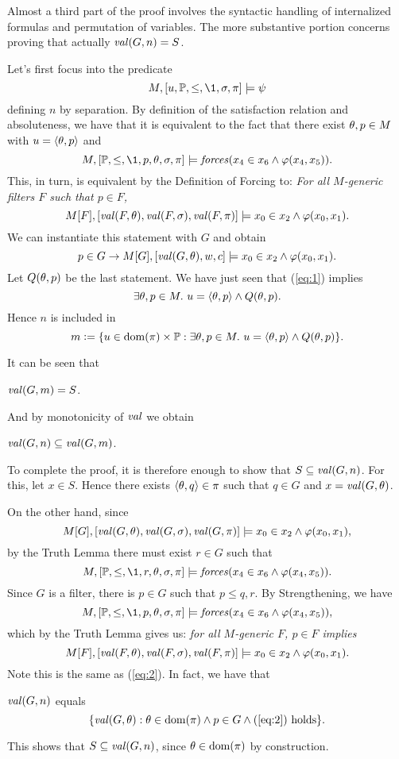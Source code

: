 Almost a third part of the proof involves the syntactic handling of
internalized formulas and permutation of variables. The more
substantive portion concerns proving that actually $\operatorname{\mathit{val}}(G,n)=S$.

Let's first focus into the predicate 
\begin{equation}\label{eq:1}
M,[u,\PP,\leq,\1,\sig,\pi]\models \psi
\end{equation}
defining $n$ by separation. By definition of the satisfaction
relation and %
absoluteness, we have that it is equivalent to the fact
that there exist $\theta,p\in M$ with   $u=\langle\theta,p\rangle$  and 
\[
M,[\PP,\leq,\1,p,\th,\sig,\pi]\models \forceisa(x_4\in
x_6\y\phi(x_4,x_5)). 
\]
This, in turn, is equivalent by the Definition of Forcing to: \emph{For all $M$-generic
filters $F$ such that $p\in F$,} 
\begin{equation}\label{eq:2}
M[F],[\val(F,\th),\val(F,\sig),\val(F,\pi)]\models x_0\in
x_2\y\phi(x_0,x_1). 
\end{equation}
We can instantiate this statement with $G$ and obtain
\[
p\in G \rightarrow M[G],[\operatorname{\mathit{val}}(G,\theta),w,c]\models x_0\in
x_2\wedge\varphi(x_0,x_1). 
\] 
Let $Q(\theta,p)$ be the last statement. We have just seen that
(\ref{eq:1}) implies 
\[
\exists \theta,p\in M.\ u=\langle\theta,p\rangle \wedge Q(\theta,p).
\]
Hence $n$ is included in 
\[
m\mathrel{\mathop:}= \{u \in\operatorname{dom}(\pi)\times\mathbb{P} : \exists \theta,p\in M.\ u=\langle\theta,p\rangle
\wedge Q(\theta,p)\}. 
\]

It can be seen that
\begin{lemma}
  $\operatorname{\mathit{val}}(G,m) = S$.
\end{lemma}
\noindent And by monotonicity of $\operatorname{\mathit{val}}$ we obtain
\begin{lemma}
  $\operatorname{\mathit{val}}(G,n)\subseteq \operatorname{\mathit{val}}(G,m)$.
\end{lemma}
To complete the proof, it is therefore enough to show that
$S\subseteq \operatorname{\mathit{val}}(G,n)$. For this, let $x\in S$. Hence there exists
$\langle\theta,q\rangle\in\pi$ such that 
$q\in G$ and $x=\operatorname{\mathit{val}}(G,\theta)$. 

On the other hand, since 
\[
M[G],[\operatorname{\mathit{val}}(G,\theta),\operatorname{\mathit{val}}(G,\sigma),\operatorname{\mathit{val}}(G,\pi)]\models
 x_0\in x_2\wedge\varphi( x_0, x_1),
\]
by the  Truth Lemma there must exist $r\in G$ such that
\[
M,[\PP,\leq,\1,r,\th,\sig,\pi]\models
\forceisa(x_4\in x_6\y\phi( x_4, x_5)).
\]
Since $G$ is a filter, there is $p\in G$ such that $p\leq q, r$.
By Strengthening, we have
\[
M,[\PP,\leq,\1,p,\th,\sig,\pi]\models
\forceisa(x_4\in x_6\y \phi( x_4, x_5)),
\]
which by the Truth Lemma gives us: \emph{for all $M$-generic $F$,
  $p\in F$ implies} 
\[
M[F],[\operatorname{\mathit{val}}(F,\theta),\operatorname{\mathit{val}}(F,\sigma),\operatorname{\mathit{val}}(F,\pi)]\models
 x_0\in  x_2 \wedge\varphi( x_0, x_1).
\]
Note this is the same as (\ref{eq:2}). In fact, we have that
\begin{lemma}
  $\operatorname{\mathit{val}}(G,n)$ equals
  \[
  \{\operatorname{\mathit{val}}(G,\theta): \theta\in\operatorname{dom}(\pi) \wedge  p \in G 
  \wedge \text{(\ref{eq:2}) holds}\}.
  \]
\end{lemma}
This shows that $S\subseteq \operatorname{\mathit{val}}(G,n)$, since $\theta\in\operatorname{dom}(\pi)$ by construction. 
   
